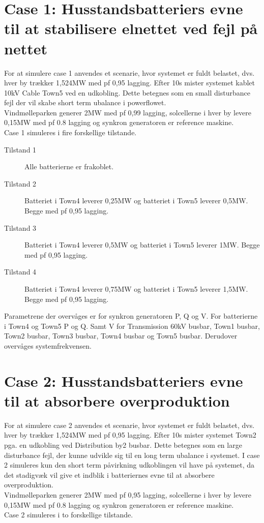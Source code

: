 
\label{Simulering}

\section{Case 1: Husstandsbatteriers evne til at stabilisere elnettet ved fejl på nettet}
\label{SimCase1}
For at simulere case 1 anvendes et scenarie, hvor systemet er fuldt belastet, dvs. hver by trækker 1,524MW med pf 0,95 lagging. Efter 10s mister systemet kablet 10kV Cable Town5 ved en udkobling. Dette betegnes som en small disturbance fejl der vil skabe short term ubalance i powerflowet.\\
Vindmølleparken generer 2MW med pf 0,99 lagging, solcellerne i hver by levere 0,15MW med pf 0.8 lagging og synkron generatoren er reference maskine.\\
Case 1 simuleres i fire forskellige tilstande.

\begin{description}
	\item[Tilstand 1] Alle batterierne er frakoblet.
	\item[Tilstand 2] Batteriet i Town4 leverer 0,25MW og batteriet i Town5 leverer 0,5MW. Begge med pf 0,95 lagging.
	\item[Tilstand 3] Batteriet i Town4 leverer 0,5MW og batteriet i Town5 leverer 1MW. Begge med pf 0,95 lagging.
	\item[Tilstand 4] Batteriet i Town4 leverer 0,75MW og batteriet i Town5 leverer 1,5MW. Begge med pf 0,95 lagging.
\end{description}

Parametrene der overvåges er for synkron generatoren P, Q og V.
For batterierne i Town4 og Town5 P og Q. Samt V for Transmission 60kV busbar, Town1 busbar, Town2 busbar, Town3 busbar, Town4 busbar og Town5 busbar.
Derudover overvåges systemfrekvensen.

\section{Case 2: Husstandsbatteriers evne til at absorbere overproduktion}
\label{SimCase2}
For at simulere case 2 anvendes et scenarie, hvor systemet er fuldt belastet, dvs. hver by trækker 1,524MW med pf 0,95 lagging. Efter 10s mister systemet Town2 pga. en udkobling ved Distribution by2 busbar. Dette betegnes som en large disturbance fejl, der kunne udvikle sig til en long term ubalance i systemet. I case 2 simuleres kun den short term påvirkning udkoblingen vil have på systemet, da det stadigvæk vil give et indblik i batteriernes evne til at absorbere overproduktion.\\
Vindmølleparken generer 2MW med pf 0,95 lagging, solcellerne i hver by levere 0,15MW med pf 0.8 lagging og synkron generatoren er reference maskine.\\
Case 2 simuleres i to forskellige tilstande.

